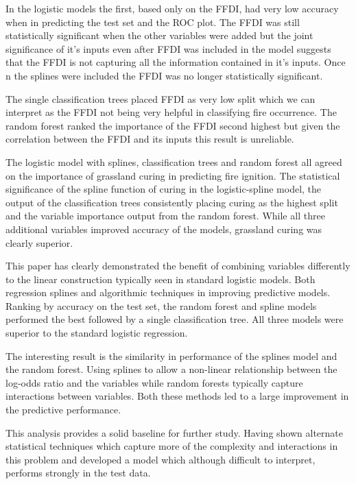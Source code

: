 \documentclass[11pt,a4paper]{article}
\begin{document}
In the logistic models the first, based only on the FFDI, had very low accuracy when  in predicting the test set and the ROC plot. The FFDI was still statistically significant when the other variables were added but the joint significance of it's inputs even after FFDI was included in the model suggests that the FFDI is not capturing all the information contained in it's inputs. Once n the splines were included the FFDI was no longer statistically significant.

The single classification trees placed FFDI as very low split which we can interpret as the FFDI not being very helpful in classifying fire occurrence. The random forest ranked the importance of the FFDI second highest but given the correlation between the FFDI and its inputs this result is unreliable.

The logistic model with splines, classification trees and random forest all agreed on the importance of grassland curing in predicting fire ignition. The statistical significance of the spline function of curing in the logistic-spline model, the output of the classification trees consistently placing curing as the highest split and the variable importance output from the random forest. While all three additional variables improved accuracy of the models, grassland curing was clearly superior.

This paper has clearly demonstrated the benefit of combining variables differently to the linear construction typically seen in standard logistic models. Both regression splines and algorithmic techniques in improving predictive models. Ranking by accuracy on the test set, the random forest and spline models performed the best followed by a single classification tree. All three models were superior to the standard logistic regression.

The interesting result is the similarity in performance of the splines model and the random forest. Using splines to allow a non-linear relationship between the log-odds ratio and the variables while random forests typically capture interactions between variables. Both these methods led to a large improvement in the predictive performance.

This analysis provides a solid baseline for further study. Having shown alternate statistical techniques which capture more of the complexity and interactions in this problem and developed a model which although difficult to interpret, performs strongly in the test data.




\end{document}
